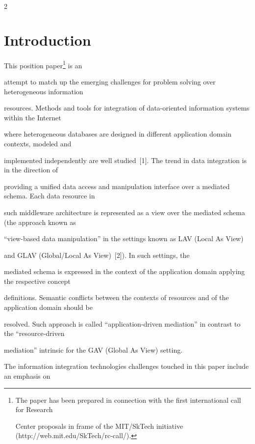       \begin{multicols}{2}



            \label{st\stat}



\section{Introduction}



\noindent

This position paper\footnote[4]{The paper has been prepared in connection with the first international call for Research 

Center proposals in frame of the MIT/SkTech initiative ({\sf http://web.mit.edu/SkTech/rc-call/}).} is an 

attempt to match up the emerging challenges for problem solving over heterogeneous information 

resources. Methods and tools for integration of data-oriented information systems within the Internet 

where heterogeneous databases are designed in different application domain contexts, modeled and 

implemented independently are well studied~[1]. The trend in data integration is in the direction of 

providing a unified data access and manipulation interface over a mediated schema. Each data resource in 

such middleware architecture is represented as a view over the mediated schema (the approach known as 

``view-based data manipulation'' in the settings known as LAV (Local As View)

and GLAV (Global/Local As View)~[2]). In such settings, the 

mediated schema is expressed in the context of the application domain applying the respective concept 

definitions. Semantic conflicts between the contexts of resources and of the application domain should be 

resolved. Such approach is called ``application-driven mediation'' in contrast to the ``resource-driven 

mediation'' intrinsic for the GAV (Global As View) setting.



The information integration technologies challenges touched in this paper include an emphasis on 


\end{multicols}
